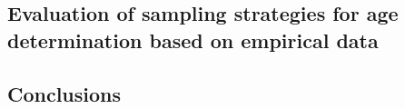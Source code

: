 \documentclass[a4paper 12pt]{article}
\numberwithin{equation}{section}
\newcommand{\ed}[1]{\textcolor{red}{#1}}
\newcommand{\olav}[1]{\textcolor{darkgreen}{#1}}
\begin{document}


\subsection*{\normalsize Evaluation of sampling strategies for age determination based on empirical data}


\subsection*{\normalsize Conclusions}
\label{sec:conclusion}


\clearpage   
\end{document}
